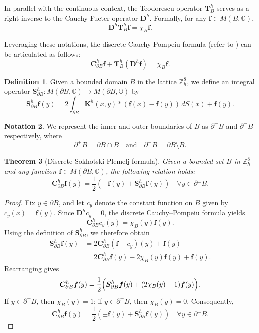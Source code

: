 \documentclass{amsart}
\newtheorem{theorem}{Theorem}[section]
\theoremstyle{definition}
\newtheorem{definition}[theorem]{Definition}
\newtheorem{notation}[theorem]{Notation}
\theoremstyle{remark}
\numberwithin{equation}{section}
\newcommand{\p}{\partial}
\newcommand{\OO}{\mathbb O}
\newcommand{\Z}{\mathbb Z}
\newcommand{\f}{\bm{f}}
\begin{document}
	In parallel with the continuous context, the Teodorescu operator \(\bm T ^h_ B\) serves as a right inverse to the Cauchy-Fueter operator \(\bm D^h\). Formally, for any \(\f \in M(B, \mathbb O)\),
	\[
	\bm D^h \bm T^h_B \f = \chi_B\f.
	\]
	
	Leveraging these notations, the discrete Cauchy-Pompeiu formula (refer to ) can be articulated as follows:
	\begin{equation}
		\label{2023-09-29 10:06:18}
		\bm C^h_{\p B} \f + \bm T^h_B (\bm D^h \f ) = \chi_B \f.
	\end{equation}
	
	
	
	
	
	
	
	\begin{definition}
		Given a bounded domain \(B\) in the lattice \(\Z^8_h\), we define an integral operator \(\bm S^h_{\p B}   : M(\p  B, \OO) \to M(\p B, \OO)\) by
		\[
		\bm S^h_{\p B} \f (y) = 2\int_{\p B} \bm K^h (x,y) \ast (\f(x)-\f(y)) \, dS(x) + \f(y).
		\]
	\end{definition}
	
	\begin{notation}
		We represent the inner and outer boundaries of \(B\) as \(\p^+ B\) and \(\p^- B\) respectively, where
		\[
		\p^+ B = \p B \cap B \quad \text{and} \quad \p^- B = \p B \setminus B.
		\]
	\end{notation}
	
	
	\begin{theorem}[Discrete Sokhotski-Plemelj formula]\label{2023-09-29 10:56:55}
		Given a bounded set \(B\) in \(\Z^8_h\) and any function \(\f \in M(\p B, \OO)\), the following relation holds:
		\[
		\bm C^h_{\p B} \f (y) = \frac{1}{2}\left( \pm \f(y) + \bm S^h_{\p B} \f(y) \right) \quad \forall y \in \p^{\pm} B.
		\]
	\end{theorem}
	
\begin{proof}
	Fix \(y\in \p B\), and let \(c_y\) denote the constant function on \(\overline B\) given by \(c_y(x)=\f(y)\). Since \(\bm D^h c_y=0\), the discrete Cauchy--Pompeiu formula yields
	\[
	\bm C^h_{\p B} c_y(y)=\chi_B(y)\f(y).
	\]
	Using the definition of \(\bm S^h_{\p B}\), we therefore obtain
	\[
	\begin{aligned}
		\bm S^h_{\p B}\f(y)
		&=2\bm C^h_{\p B}(\f-c_y)(y)+\f(y)\\
		&=2\bm C^h_{\p B}\f(y)-2\chi_B(y)\f(y)+\f(y).
	\end{aligned}
	\]
	Rearranging gives
	\[
	\bm C^h_{\p B}\f(y)
	=
	\frac12\Bigl(\bm S^h_{\p B}\f(y)+(2\chi_B(y)-1)\f(y)\Bigr).
	\]
	If \(y\in \p^+B\), then \(\chi_B(y)=1\); if \(y\in \p^-B\), then \(\chi_B(y)=0\). Consequently,
	\[
	\bm C^h_{\p B} \f (y) = \frac{1}{2}\left( \pm \f(y) + \bm S^h_{\p B} \f(y) \right)
	\quad \forall y \in \p^{\pm} B.
	\]
\end{proof}
\end{document}
